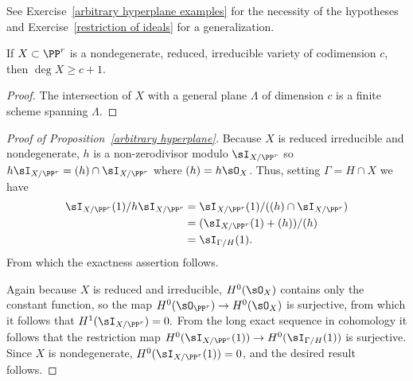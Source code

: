 See Exercise~\ref{arbitrary hyperplane examples} for the necessity of the hypotheses
and Exercise~\ref{restriction of ideals} for a generalization. 

\begin{corollary}\label{minimal degree bound}
If $X\subset \PP^r$ is a nondegenerate, reduced, irreducible variety of codimension $c$, then $\deg X \geq c+1$.
\end{corollary}

\begin{proof}
 The intersection of $X$ with a general plane $\Lambda$ of dimension $c$ is a finite scheme spanning $\Lambda$.
\end{proof}

\begin{proof}[Proof of Proposition~\ref{arbitrary hyperplane}]
Because $X$ is reduced irreducible and nondegenerate,
$h$ is a non-zerodivisor modulo $\sI_{X/\PP^r}$ so $h\sI_{X/\PP^r} = (h)\cap \sI_{X/\PP^r}$ where
$(h) = h\sO_{X}$. Thus, setting $\Gamma = {H\cap X}$
we have 
$$
\begin{aligned}
\sI_{X/\PP^r}(1)/h\sI_{X/\PP^r} &= \sI_{X/\PP^r}(1)/((h)\cap\sI_{X/\PP^r})\\
 &=(\sI_{X/\PP^r}(1)+(h))/(h)\\
 &= \sI_{\Gamma/H}(1).
\end{aligned}
 $$
 From which the exactness assertion follows.
 
 Again because $X$ is reduced and irreducible, $H^0(\sO_X)$ contains only the constant function, so the map $H^0(\sO_{\PP^r}) \to H^0(\sO_X)$ is surjective, 
from which it follows that $H^1(\sI_{X/\PP^r}) = 0.$ From the long exact sequence in cohomology it follows that
 the restriction map $H^0(\sI_{X/\PP^r}(1))\to H^0(\sI_{\Gamma/H}(1))$ is surjective. Since
$X$ is nondegenerate, $H^0(\sI_{X/\PP^r}(1)) = 0$, and the desired result follows.
\end{proof}


